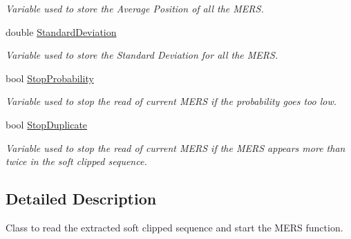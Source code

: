 \begin{DoxyCompactItemize}
\begin{DoxyCompactList}\small\item\em Variable used to store the Average Position of all the M\+E\+R\+S. \end{DoxyCompactList}\item 
\hypertarget{class_calculation_a7cf0e33896b245321fa1aa42c94416a9}{double \hyperlink{class_calculation_a7cf0e33896b245321fa1aa42c94416a9}{Standard\+Deviation}}\label{class_calculation_a7cf0e33896b245321fa1aa42c94416a9}

\begin{DoxyCompactList}\small\item\em Variable used to store the Standard Deviation for all the M\+E\+R\+S. \end{DoxyCompactList}\item 
\hypertarget{class_calculation_a25a11b3eb81c66266495c05c4a3a1a23}{bool \hyperlink{class_calculation_a25a11b3eb81c66266495c05c4a3a1a23}{Stop\+Probability}}\label{class_calculation_a25a11b3eb81c66266495c05c4a3a1a23}

\begin{DoxyCompactList}\small\item\em Variable used to stop the read of current M\+E\+R\+S if the probability goes too low. \end{DoxyCompactList}\item 
\hypertarget{class_calculation_a1635c8cddc0c2f087cbbb657d156473a}{bool \hyperlink{class_calculation_a1635c8cddc0c2f087cbbb657d156473a}{Stop\+Duplicate}}\label{class_calculation_a1635c8cddc0c2f087cbbb657d156473a}

\begin{DoxyCompactList}\small\item\em Variable used to stop the read of current M\+E\+R\+S if the M\+E\+R\+S appears more than twice in the soft clipped sequence. \end{DoxyCompactList}\end{DoxyCompactItemize}


\subsection{Detailed Description}
Class to read the extracted soft clipped sequence and start the M\+E\+R\+S function. 

